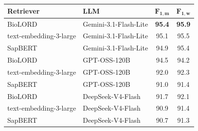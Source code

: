 \begin{tabular}{llcc}
\toprule
\textbf{Retriever} & \textbf{LLM} & $\mathbf{F_{1,m}}$ & $\mathbf{F_{1,w}}$ \\
\midrule
BioLORD & Gemini-3.1-Flash-Lite & \textbf{95.4} & \textbf{95.9} \\
text-embedding-3-large & Gemini-3.1-Flash-Lite & 95.1 & 95.5 \\
SapBERT & Gemini-3.1-Flash-Lite & 94.9 & 95.4 \\
\midrule
BioLORD & GPT-OSS-120B & 94.5 & 94.2 \\
text-embedding-3-large & GPT-OSS-120B & 92.0 & 92.3 \\
SapBERT & GPT-OSS-120B & 91.0 & 91.4 \\
\midrule
BioLORD & DeepSeek-V4-Flash & 91.7 & 92.1 \\
text-embedding-3-large & DeepSeek-V4-Flash & 90.9 & 91.4 \\
SapBERT & DeepSeek-V4-Flash & 90.7 & 91.3 \\
\bottomrule
\end{tabular}
